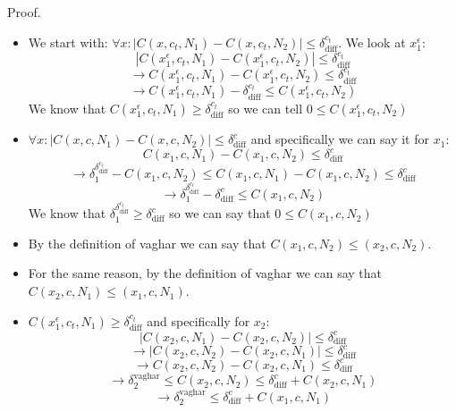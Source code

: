 \documentclass[11pt]{article}
\begin{document}
  Proof. \begin{itemize}
   \item  We start with: $ \forall{x}: |C(x,c_t,N_1)-C(x,c_t,N_2)|\leq \delta^{c_t}_{\text{diff}} $. We look at $x_1^\epsilon$:
   $$ |C(x_1^\epsilon,c_t,N_1)-C(x_1^\epsilon,c_t,N_2)|\leq \delta^{c_t}_{\text{diff}}$$ 
   $$ \rightarrow  C(x_1^\epsilon,c_t,N_1)-C(x_1^\epsilon,c_t,N_2) \leq \delta^{c_t}_{\text{diff}} $$
   $$ \rightarrow  C(x_1^\epsilon,c_t,N_1)-\delta^{c_t}_{\text{diff}} \leq C(x_1^\epsilon,c_t,N_2) $$
   We know that $C(x_1^\epsilon,c_t,N_1)\geq{\delta^{c_t}_{\text{diff}}}$ so we can tell $0 \leq C(x_1^\epsilon,c_t,N_2)$
   
   \item $ \forall{x}: |C(x,c,N_1)-C(x,c,N_2)|\leq \delta^c_{\text{diff}} $ and specifically we can say it for $x_1$:
   $$ C(x_1,c,N_1)-C(x_1,c,N_2)\leq \delta^c_{\text{diff}} $$
   $$ \rightarrow \delta_1^{\delta^{c_t}_{\text{diff}}} - C(x_1,c,N_2) \leq C(x_1,c,N_1)-C(x_1,c,N_2)\leq \delta^c_{\text{diff}} $$
   $$ \rightarrow \delta_1^{\delta^{c_t}_{\text{diff}}} - \delta^c_{\text{diff}} \leq C(x_1,c,N_2) $$
   We know that $\delta_1^{\delta^{c_t}_{\text{diff}}}\geq{\delta^c_{\text{diff}}}$ so we can say that $0 \leq C(x_1,c,N_2)$
   
   \item By the definition of vaghar we can say that $C(x_1,c,N_2)\leq(x_2,c,N_2)$. 
   \item For the same reason, by the definition of vaghar we can say that $C(x_2,c,N_1)\leq(x_1,c,N_1)$. 
   \item $C(x_1^\epsilon,c_t,N_1)\geq{\delta^{c_t}_{\text{diff}}}$ and specifically for $x_2$:
   $$ |C(x_2,c,N_1)-C(x_2,c,N_2)| \leq \delta^c_{\text{diff}} $$
   $$ \rightarrow |C(x_2,c,N_2)-C(x_2,c,N_1)| \leq \delta^c_{\text{diff}} $$
   $$ \rightarrow C(x_2,c,N_2)-C(x_2,c,N_1) \leq \delta^c_{\text{diff}} $$
   $$ \rightarrow \delta_2^\text{vaghar} \leq C(x_2,c,N_2) \leq \delta^c_{\text{diff}}+C(x_2,c,N_1) $$
   $$ \rightarrow \delta_2^\text{vaghar} \leq \delta^c_{\text{diff}}+C(x_1,c,N_1)$$

 \end{itemize}
 
\end{document}
